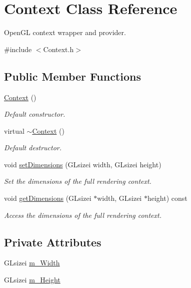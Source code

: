 \hypertarget{class_context}{}\section{Context Class Reference}
\label{class_context}


Open\+GL context wrapper and provider.  




{\ttfamily \#include $<$Context.\+h$>$}

\subsection*{Public Member Functions}
\begin{DoxyCompactItemize}
\item 
\hyperlink{class_context_a652cdcd2eedc8dbd9110bd284c5d5cf0}{Context} ()
\begin{DoxyCompactList}\small\item\em Default constructor. \end{DoxyCompactList}\item 
virtual \hyperlink{class_context_a2d34e4556448e40693f61d15e091b604}{$\sim$\+Context} ()
\begin{DoxyCompactList}\small\item\em Default destructor. \end{DoxyCompactList}\item 
void \hyperlink{class_context_aa307eab2bab2f1c8fa6f75e507040c67}{set\+Dimensions} (G\+Lsizei width, G\+Lsizei height)
\begin{DoxyCompactList}\small\item\em Set the dimensions of the full rendering context. \end{DoxyCompactList}\item 
void \hyperlink{class_context_a88746b0b9d89b5d7f4e2112440e9bdb3}{get\+Dimensions} (G\+Lsizei $\ast$width, G\+Lsizei $\ast$height) const 
\begin{DoxyCompactList}\small\item\em Access the dimensions of the full rendering context. \end{DoxyCompactList}\end{DoxyCompactItemize}
\subsection*{Private Attributes}
\begin{DoxyCompactItemize}
\item 
G\+Lsizei \hyperlink{class_context_a1813b1a12aaf96ec0ec501194bd56b41}{m\+\_\+\+Width}
\item 
G\+Lsizei \hyperlink{class_context_a78dabc1cab62e8b36ac7330f7c8e4c4b}{m\+\_\+\+Height}
\end{DoxyCompactItemize}


